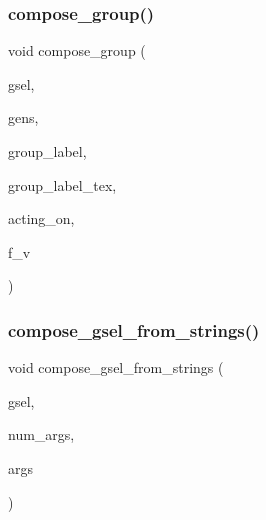 \subsubsection{\texorpdfstring{compose\+\_\+group()}{compose\_group()}}
{\footnotesize\ttfamily void compose\+\_\+group (\begin{DoxyParamCaption}\item[{\mbox{\hyperlink{class_vector}{Vector}} \&}]{gsel,  }\item[{\mbox{\hyperlink{class_vector}{Vector}} \&}]{gens,  }\item[{\mbox{\hyperlink{classhollerith}{hollerith}} \&}]{group\+\_\+label,  }\item[{\mbox{\hyperlink{classhollerith}{hollerith}} \&}]{group\+\_\+label\+\_\+tex,  }\item[{\mbox{\hyperlink{classhollerith}{hollerith}} \&}]{acting\+\_\+on,  }\item[{\mbox{\hyperlink{galois_8h_a09fddde158a3a20bd2dcadb609de11dc}{I\+NT}}}]{f\+\_\+v }\end{DoxyParamCaption})}

\mbox{\label{group__selection_8_c_ad7e135c37a81df277ecc3cf7c0243388}} 
\subsubsection{\texorpdfstring{compose\+\_\+gsel\+\_\+from\+\_\+strings()}{compose\_gsel\_from\_strings()}}
{\footnotesize\ttfamily void compose\+\_\+gsel\+\_\+from\+\_\+strings (\begin{DoxyParamCaption}\item[{\mbox{\hyperlink{class_vector}{Vector}} \&}]{gsel,  }\item[{\mbox{\hyperlink{galois_8h_a09fddde158a3a20bd2dcadb609de11dc}{I\+NT}}}]{num\+\_\+args,  }\item[{char $\ast$$\ast$}]{args }\end{DoxyParamCaption})}

\mbox{\label{group__selection_8_c_ae9d06c32f57acbf2e64270fb8beaa2cc}} 
